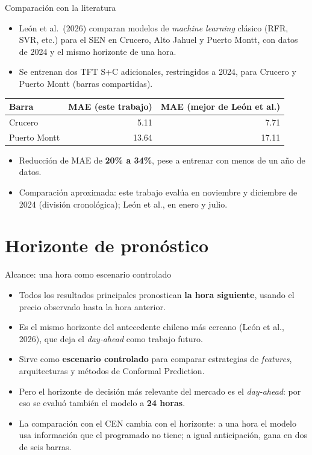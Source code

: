 \documentclass[aspectratio=169]{beamer}
\begin{document}
\begin{frame}{Comparación con la literatura}
    \begin{itemize}
        \item León et al.\ (2026) comparan modelos de \textit{machine learning} clásico (RFR, SVR, etc.) para el SEN en Crucero, Alto Jahuel y Puerto Montt, con datos de 2024 y el mismo horizonte de una hora.
        \item Se entrenan dos TFT S+C adicionales, restringidos a 2024, para Crucero y Puerto Montt (barras compartidas).
    \end{itemize}
    \begin{table}
        \centering
        \small
        \begin{tabular}{lrr}
            \toprule
            Barra & MAE (este trabajo) & MAE (mejor de León et al.) \\
            \midrule
            Crucero & 5.11 & 7.71 \\
            Puerto Montt & 13.64 & 17.11 \\
            \bottomrule
        \end{tabular}
    \end{table}
    \begin{itemize}
        \item Reducción de MAE de \textbf{20\% a 34\%}, pese a entrenar con menos de un año de datos.
        \item Comparación aproximada: este trabajo evalúa en noviembre y diciembre de 2024 (división cronológica); León et al., en enero y julio.
    \end{itemize}
\end{frame}

\section{Horizonte de pronóstico}

\begin{frame}{Alcance: una hora como escenario controlado}
    \begin{itemize}
        \item Todos los resultados principales pronostican \textbf{la hora siguiente}, usando el precio observado hasta la hora anterior.
        \item Es el mismo horizonte del antecedente chileno más cercano (León et al., 2026), que deja el \textit{day-ahead} como trabajo futuro.
        \item Sirve como \textbf{escenario controlado} para comparar estrategias de \textit{features}, arquitecturas y métodos de Conformal Prediction.
        \item Pero el horizonte de decisión más relevante del mercado es el \textit{day-ahead}: por eso se evaluó también el modelo a \textbf{24 horas}.
        \item La comparación con el CEN cambia con el horizonte: a una hora el modelo usa información que el programado no tiene; a igual anticipación, gana en dos de seis barras.
    \end{itemize}
\end{frame}
\end{document}
